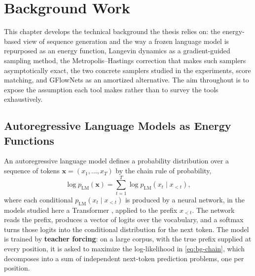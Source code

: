 \chapter{Background Work}
\label{ch:background}

This chapter develops the technical background the thesis relies on: the energy-based view of sequence generation and the way a frozen language model is repurposed as an energy function, Langevin dynamics as a gradient-guided sampling method, the Metropolis--Hastings correction that makes such samplers asymptotically exact, the two concrete samplers studied in the experiments, score matching, and GFlowNets as an amortized alternative. The aim throughout is to expose the assumption each tool makes rather than to survey the tools exhaustively.

\section{Autoregressive Language Models as Energy Functions}
\label{sec:bg-ebm}

An autoregressive language model defines a probability distribution over a sequence of tokens $\bm{x} = (x_1, \dots, x_T)$ by the chain rule of probability,
\begin{equation}
    \log p_{\text{LM}}(\bm{x}) = \sum_{t=1}^{T} \log p_{\text{LM}}(x_t \mid x_{<t}),
    \label{eq:bg-chain}
\end{equation}
where each conditional $p_{\text{LM}}(x_t \mid x_{<t})$ is produced by a neural network, in the models studied here a Transformer \citep{vaswani2017attention}, applied to the prefix $x_{<t}$. The network reads the prefix, produces a vector of logits over the vocabulary, and a softmax turns those logits into the conditional distribution for the next token. The model is trained by \textbf{teacher forcing}: on a large corpus, with the true prefix supplied at every position, it is asked to maximize the log-likelihood in \eqref{eq:bg-chain}, which decomposes into a sum of independent next-token prediction problems, one per position.

